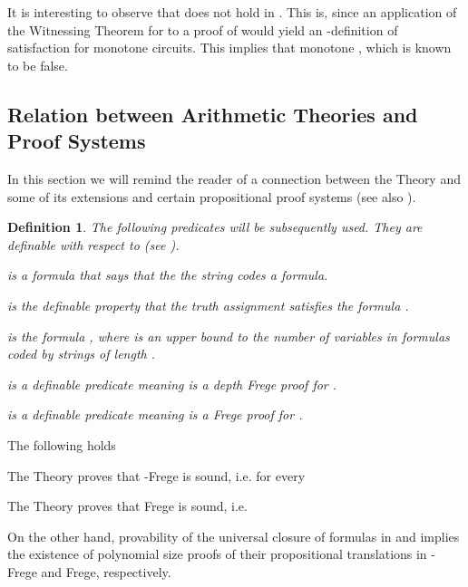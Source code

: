 \documentclass{LMCS}
\newtheorem{definition}{Definition}[section]
\begin{document}
It is interesting to observe that  does not hold in . This is, since an application of the Witnessing
Theorem for  to a proof of  would yield an -definition of satisfaction for monotone
 circuits. This implies that monotone , which is known to be
false.


\subsection{Relation between Arithmetic Theories and Proof Systems}\label{Sec:Rel BA pps}

In this section we will remind the reader of a connection between the Theory  and some of its extensions
and certain propositional proof systems (see also \cite{CN10}\cite{Kra95}).


\begin{definition}The following predicates will be subsequently used. They are definable with respect to 
 (see \cite{Kra95}).
  \begin{iteMize}{}
    \item  is a  formula that says that the the string  codes a
    formula.
    \item  is the  definable property that the truth assignment  satisfies the formula .
    \item  is the  formula , where  is an upper bound to the number of variables in formulas coded by strings of length .
    \item  is a  definable predicate meaning  is a
    depth  Frege proof for .
    \item  is a  definable predicate meaning  is a Frege
    proof for .
  \end{iteMize}
\end{definition}

The following holds

\begin{fact}\label{fact:VZ and bd Frege}
  The Theory  proves that -Frege is sound, i.e. for every  
\end{fact}

\begin{fact}\label{fact:VNC1 and NC1 Frege}
  The Theory  proves that Frege is sound, i.e. 
\end{fact}

On the other hand, provability of the universal closure of  formulas in  and  implies
the existence of polynomial size proofs of their propositional translations in -Frege and Frege,
respectively.
\end{document}
